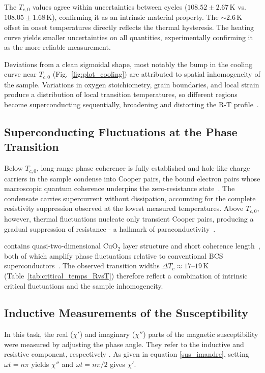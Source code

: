 \documentclass[a4paper,11pt]{article}
\numberwithin{equation}{section}
\begin{document}
The $T_{c,0}$ values agree within uncertainties between cycles 
($108.52 \pm 2.67\,\text{K}$ vs.\ $108.05 \pm 1.68\,\text{K}$), confirming 
it as an intrinsic material property. The ${\sim}2.6\,\text{K}$ 
offset in onset temperatures directly reflects the thermal hysteresis. The 
heating curve yields smaller uncertainties on all quantities, experimentally confirming it 
as the more reliable measurement.

Deviations from a clean sigmoidal shape, most notably the bump in the 
cooling curve near $T_{c,0}$ (Fig.~\ref{fig:plot_cooling}) are attributed 
to spatial inhomogeneity of the sample. Variations in 
oxygen stoichiometry, grain boundaries, and local strain produce a 
distribution of local transition temperatures, so different regions become 
superconducting sequentially, broadening and distorting the R-T 
profile~\cite{vanderBeek1992}.

\subsection{Superconducting Fluctuations at the Phase Transition}

Below $T_{c,0}$, long-range phase coherence is fully established and hole-like 
charge carriers in the sample condense into Cooper pairs, the 
bound electron pairs whose macroscopic quantum coherence underpins the 
zero-resistance state~\cite{Tinkham1996}. The condensate carries supercurrent 
without dissipation, accounting for the complete resistivity suppression 
observed at the lowest measured temperatures. Above $T_{c,0}$, however, 
thermal fluctuations nucleate only transient Cooper pairs, producing a 
gradual suppression of resistance - a hallmark of 
paraconductivity~\cite{aslamazov1968,larkin2005}.

 contains quasi-two-dimensional CuO$_2$ layer structure and short coherence 
length~\cite{junod1990}, both of which amplify phase fluctuations relative 
to conventional BCS superconductors~\cite{Tinkham1996}. The observed 
transition widths $\Delta T_c \approx 17$--$19\,\text{K}$ 
(Table~\ref{tab:critical_temps_RvsT}) therefore reflect a combination of 
intrinsic critical fluctuations and the sample inhomogeneity.


\subsection{Inductive Measurements of the Susceptibility}
In this task, the real ($\chi'$) and imaginary ($\chi''$) parts of the magnetic susceptibility were measured by adjusting the phase angle. They refer to the inductive and resistive component, respectively \cite{experiment}. As given in equation \ref{sus_imandre}, setting $\omega t = n\pi$ yields $\chi''$ and $\omega t = n\pi/2$ gives $\chi'$. 
\end{document}
